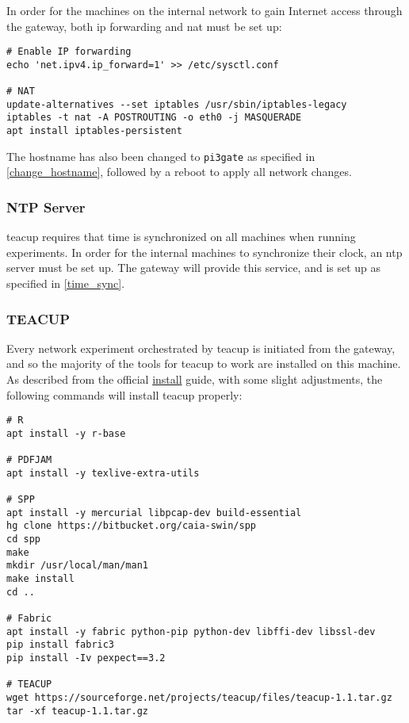 In order for the machines on the internal network to gain Internet access through the gateway, both \gls{ip} forwarding and \gls{nat} must be set up:

\begin{verbatim}
# Enable IP forwarding
echo 'net.ipv4.ip_forward=1' >> /etc/sysctl.conf

# NAT
update-alternatives --set iptables /usr/sbin/iptables-legacy
iptables -t nat -A POSTROUTING -o eth0 -j MASQUERADE
apt install iptables-persistent
\end{verbatim}

The hostname has also been changed to \lstinline{pi3gate} as specified in \ref{change_hostname}, followed by a reboot to apply all network changes.


\subsubsection{NTP Server}

\gls{teacup} requires that time is synchronized on all machines when running experiments. In order for the internal machines to synchronize their clock, an \gls{ntp} server must be set up. The gateway will provide this service, and is set up as specified in \ref{time_sync}.


\subsubsection{TEACUP} \label{teacup_gateway}

Every network experiment orchestrated by \gls{teacup} is initiated from the gateway, and so the majority of the tools for \gls{teacup} to work are installed on this machine. As described from the official \href{http://caia.swin.edu.au/tools/teacup/TEACUP-0.9_INSTALL.txt}{install} guide, with some slight adjustments, the following commands will install \gls{teacup} properly:

\begin{verbatim}
# R
apt install -y r-base

# PDFJAM
apt install -y texlive-extra-utils

# SPP
apt install -y mercurial libpcap-dev build-essential
hg clone https://bitbucket.org/caia-swin/spp
cd spp
make
mkdir /usr/local/man/man1
make install
cd ..

# Fabric
apt install -y fabric python-pip python-dev libffi-dev libssl-dev
pip install fabric3
pip install -Iv pexpect==3.2

# TEACUP
wget https://sourceforge.net/projects/teacup/files/teacup-1.1.tar.gz
tar -xf teacup-1.1.tar.gz
\end{verbatim}

